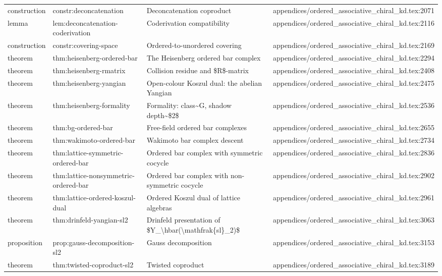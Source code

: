 \documentclass[11pt]{article}
\begin{document}
\begin{longtable}{L{0.10\textwidth}L{0.26\textwidth}L{0.42\textwidth}L{0.22\textwidth}}
construction & constr:deconcatenation & Deconcatenation coproduct & appendices/ordered\_associative\_chiral\_kd.tex:2071\\
lemma & lem:deconcatenation-coderivation & Coderivation compatibility & appendices/ordered\_associative\_chiral\_kd.tex:2116\\
construction & constr:covering-space & Ordered-to-unordered covering & appendices/ordered\_associative\_chiral\_kd.tex:2169\\
theorem & thm:heisenberg-ordered-bar & The Heisenberg ordered bar complex & appendices/ordered\_associative\_chiral\_kd.tex:2294\\
theorem & thm:heisenberg-rmatrix & Collision residue and \$R\$-matrix & appendices/ordered\_associative\_chiral\_kd.tex:2408\\
theorem & thm:heisenberg-yangian & Op{}en-colour Koszul dual: the abelian Yangian & appendices/ordered\_associative\_chiral\_kd.tex:2475\\
theorem & thm:heisenberg-formality & Formality: class\textasciitilde{}G, shadow depth\textasciitilde{}\$2\$ & appendices/ordered\_associative\_chiral\_kd.tex:2536\\
theorem & thm:bg-ordered-bar & Free-field ordered bar complexes & appendices/ordered\_associative\_chiral\_kd.tex:2655\\
theorem & thm:wakimoto-ordered-bar & Wakimoto bar complex descent & appendices/ordered\_associative\_chiral\_kd.tex:2734\\
theorem & thm:lattice-symmetric-ordered-bar & Ordered bar complex with symmetric cocycle & appendices/ordered\_associative\_chiral\_kd.tex:2836\\
theorem & thm:lattice-nonsymmetric-ordered-bar & Ordered bar complex with non-symmetric cocycle & appendices/ordered\_associative\_chiral\_kd.tex:2902\\
theorem & thm:lattice-ordered-koszul-dual & Ordered Koszul dual of lattice algebras & appendices/ordered\_associative\_chiral\_kd.tex:2961\\
theorem & thm:drinfeld-yangian-sl2 & Drinfeld presentation of \$Y\_\textbackslash{}hbar(\textbackslash{}mathfrak\{sl\}\_2)\$ & appendices/ordered\_associative\_chiral\_kd.tex:3063\\
proposition & prop:gauss-decomposition-sl2 & Gauss decomposition & appendices/ordered\_associative\_chiral\_kd.tex:3153\\
theorem & thm:twisted-coproduct-sl2 & Twisted coproduct & appendices/ordered\_associative\_chiral\_kd.tex:3189\\

\end{longtable}
\end{document}
